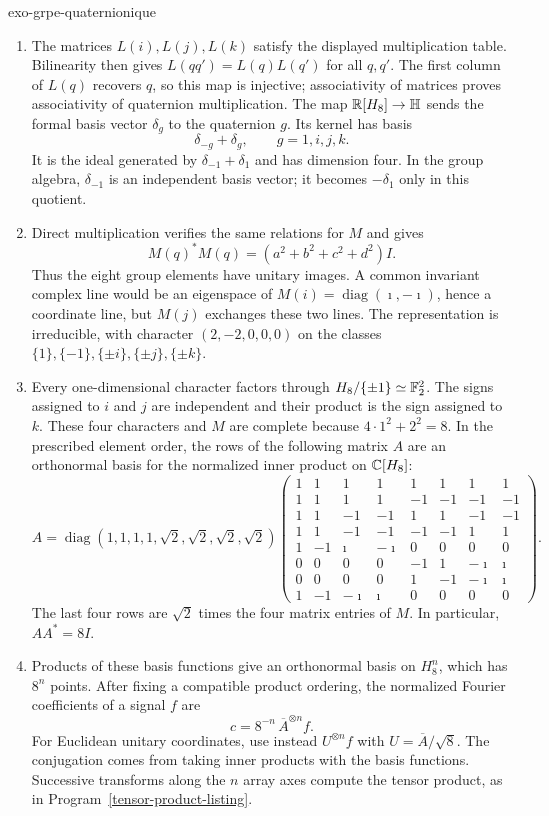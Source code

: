 \begin{correction}{exo-grpe-quaternionique}
\begin{enumerate}
\item The matrices $L(i),L(j),L(k)$ satisfy the displayed multiplication
table. Bilinearity then gives $L(qq')=L(q)L(q')$ for all $q,q'$.
The first column of $L(q)$ recovers $q$, so this map is injective;
associativity of matrices proves associativity of quaternion multiplication.
The map $\mathbb{R}[H_8]\to\mathbb H$ sends the formal basis vector $\delta_g$
to the quaternion $g$. Its kernel has basis
\[
 \delta_{-g}+\delta_g,\qquad g=1,i,j,k.
\]
It is the ideal generated by $\delta_{-1}+\delta_1$ and has dimension
four. In the group algebra, $\delta_{-1}$ is an independent basis
vector; it becomes $-\delta_1$ only in this quotient.
\item Direct multiplication verifies the same relations for $M$ and gives
\[
 M(q)^*M(q)=(a^2+b^2+c^2+d^2)I.
\]
Thus the eight group elements have unitary images. A common invariant
complex line would be an eigenspace of $M(i)=\operatorname{diag}(\imath,-\imath)$,
hence a coordinate line, but $M(j)$ exchanges these two lines. The
representation is irreducible, with character $(2,-2,0,0,0)$ on
the classes $\{1\},\{-1\},\{\pm i\},\{\pm j\},\{\pm k\}$.
\item Every one-dimensional character factors through
$H_8/\{\pm1\}\simeq\mathbb{F}_2^2$. The signs assigned to $i$ and $j$
are independent and their product is the sign assigned to $k$.
These four characters and $M$ are complete because $4\cdot1^2+2^2=8$.
In the prescribed element order, the rows of the following matrix $A$
are an orthonormal basis for the normalized inner product on $\mathbb{C}[H_8]$:
\[
 A=\operatorname{diag}(1,1,1,1,\sqrt2,\sqrt2,\sqrt2,\sqrt2)
 \begin{pmatrix}
 1&1&1&1&1&1&1&1\\
 1&1&1&1&-1&-1&-1&-1\\
 1&1&-1&-1&1&1&-1&-1\\
 1&1&-1&-1&-1&-1&1&1\\
 1&-1&\imath&-\imath&0&0&0&0\\
 0&0&0&0&-1&1&-\imath&\imath\\
 0&0&0&0&1&-1&-\imath&\imath\\
 1&-1&-\imath&\imath&0&0&0&0
 \end{pmatrix}.
\]
The last four rows are $\sqrt2$ times the four matrix entries of $M$.
In particular, $AA^*=8I$.
\item Products of these basis functions give an orthonormal basis on
$H_8^n$, which has $8^n$ points. After fixing a compatible product
ordering, the normalized Fourier coefficients of a signal $f$ are
\[
 c=8^{-n}\,\overline A^{\otimes n}f.
\]
For Euclidean unitary coordinates, use instead
$U^{\otimes n}f$ with $U=\overline A/\sqrt8$.
The conjugation comes from taking inner products with the basis
functions. Successive transforms along the $n$ array axes compute
the tensor product, as in Program~\ref{tensor-product-listing}.
\end{enumerate}
\end{correction}

